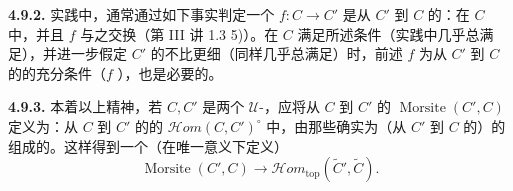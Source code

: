 \textbf{4.9.2.} 实践中，通常通过如下事实判定一个 $f:C\to C'$ 是从 $C'$ 到 $C$ 的：在 $C$ 中，并且 $f$ 与之交换（第 III 讲 1.3 5)）。在 $C$ 满足所述条件（实践中几乎总满足），并进一步假定 $C'$ 的不比更细（同样几乎总满足）时，前述 $f$ 为从 $C'$ 到 $C$ 的的充分条件（$f$ ），也是必要的。

\textbf{4.9.3.} 本着以上精神，若 $C,C'$ 是两个 $\mathcal U$-，应将从 $C$ 到 $C'$ 的 $\operatorname{Morsite}(C',C)$ 定义为：从 $C$ 到 $C'$ 的的 $\mathscr Hom(C,C')^\circ$ 中，由那些确实为（从 $C'$ 到 $C$ 的）的组成的。这样得到一个（在唯一意义下定义）
\[
 \operatorname{Morsite}(C',C)\longrightarrow\mathscr Hom_{\mathrm{top}}(\widetilde C',\widetilde C).
\]

